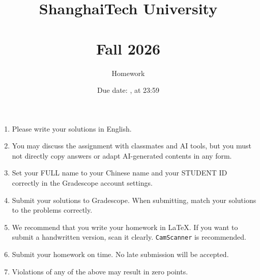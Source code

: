 \documentclass[11pt, addpoints, a4paper, answers]{exam}
\title{
    \vspace{25pt}
    \LARGE ShanghaiTech University \\
    \bigskip
    \textbf{\CourseName} \\
    \textbf{Fall 2026}   \\
    \bigskip
}
\author{\LARGE  Homework \HomeworkNO}
\date{\large Due date: \DueDate, at 23:59}
\newcommand{\ttt}{\texttt}
\begin{document}
\maketitle

\vspace{50pt}


\begin{enumerate}
    \item Please write your solutions in English.
    \item You may discuss the assignment with classmates and AI tools, but you must not directly copy answers or adapt AI-generated contents in any form.
    \item Set your FULL name to your Chinese name and your STUDENT ID correctly in the Gradescope account settings.
    \item Submit your solutions to Gradescope. When submitting, match your solutions to the problems correctly.
    \item We recommend that you write your homework in \LaTeX. If you want to submit a handwritten version, scan it clearly. \ttt{CamScanner} is recommended.
    \item Submit your homework on time. No late submission will be accepted.
    \item Violations of any of the above may result in zero points.
\end{enumerate}

\newpage

\begin{questions}


    \newpage
    

    \newpage
    

    \newpage

    

    \newpage
    

\end{questions}
\end{document}
